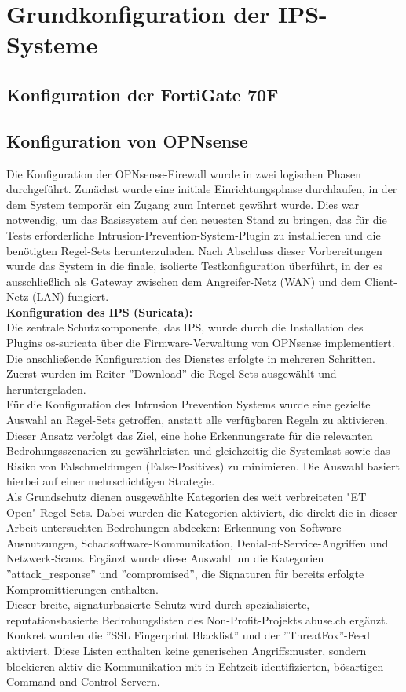 \section{Grundkonfiguration der IPS-Systeme}
\subsection{Konfiguration der FortiGate 70F}
\subsection{Konfiguration von OPNsense}

Die Konfiguration der OPNsense-Firewall wurde in zwei logischen Phasen durchgeführt. Zunächst wurde eine initiale Einrichtungsphase durchlaufen, in der dem System temporär ein Zugang zum Internet gewährt wurde. Dies war notwendig, um das Basissystem auf den neuesten Stand zu bringen, das für die Tests erforderliche Intrusion-Prevention-System-Plugin zu installieren und die benötigten Regel-Sets herunterzuladen. Nach Abschluss dieser Vorbereitungen wurde das System in die finale, isolierte Testkonfiguration überführt, in der es ausschließlich als Gateway zwischen dem Angreifer-Netz (WAN) und dem Client-Netz (LAN) fungiert.\\

\textbf{Konfiguration des IPS (Suricata):}\\
Die zentrale Schutzkomponente, das IPS, wurde durch die Installation des Plugins os-suricata über die Firmware-Verwaltung von OPNsense implementiert. Die anschließende Konfiguration des Dienstes erfolgte in mehreren Schritten. Zuerst wurden im Reiter ''Download'' die Regel-Sets ausgewählt und heruntergeladen.\\

Für die Konfiguration des Intrusion Prevention Systems wurde eine gezielte Auswahl an Regel-Sets getroffen, anstatt alle verfügbaren Regeln zu aktivieren. Dieser Ansatz verfolgt das Ziel, eine hohe Erkennungsrate für die relevanten Bedrohungsszenarien zu gewährleisten und gleichzeitig die Systemlast sowie das Risiko von Falschmeldungen (False-Positives) zu minimieren. Die Auswahl basiert hierbei auf einer mehrschichtigen Strategie.\\
Als Grundschutz dienen ausgewählte Kategorien des weit verbreiteten "ET Open"-Regel-Sets. Dabei wurden die Kategorien aktiviert, die direkt die in dieser Arbeit untersuchten Bedrohungen abdecken: Erkennung von Software-Ausnutzungen, Schadsoftware-Kommunikation, Denial-of-Service-Angriffen und Netzwerk-Scans. Ergänzt wurde diese Auswahl um die Kategorien ''attack\_response'' und ''compromised'', die Signaturen für bereits erfolgte Kompromittierungen enthalten.\\
Dieser breite, signaturbasierte Schutz wird durch spezialisierte, reputationsbasierte Bedrohungslisten des Non-Profit-Projekts abuse.ch ergänzt. Konkret wurden die ''SSL Fingerprint Blacklist'' und der ''ThreatFox''-Feed aktiviert. Diese Listen enthalten keine generischen Angriffsmuster, sondern blockieren aktiv die Kommunikation mit in Echtzeit identifizierten, bösartigen Command-and-Control-Servern.

